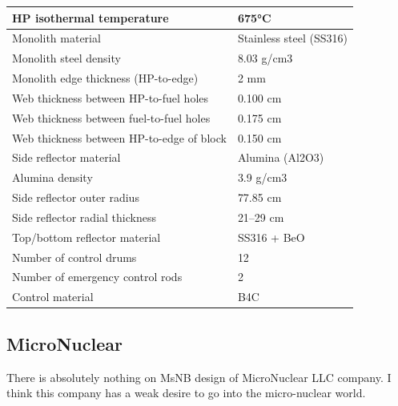 \documentclass[10pt,a4paper]{article}
\begin{document}
\begin{table} [hbtp]
\begin{center}
\begin{tabular}{l     l}
HP isothermal temperature&675°C        \\
\hline 
Monolith material&Stainless steel (SS316)       \\
Monolith steel density&8.03 g/cm3                         \\
Monolith edge thickness (HP-to-edge)&2 mm                                 \\
Web thickness between HP-to-fuel holes&0.100 cm                            \\
Web thickness between fuel-to-fuel holes&0.175 cm                            \\
Web thickness between HP-to-edge of block&0.150 cm                            \\
\hline 
Side reflector material&Alumina (Al2O3)       \\
Alumina density&3.9 g/cm3                        \\
Side reflector outer radius&77.85 cm                                 \\
Side reflector radial thickness&21–29 cm                            \\
Top/bottom reflector material&SS316 + BeO                            \\
\hline 
Number of control drums&12       \\
Number of emergency control rods&2       \\
Control material&B4C                        \\
\hline 

\end{tabular}
\end{center}
\end{table}

\subsection{MicroNuclear}
There is absolutely nothing on MsNB design of MicroNuclear LLC company. I think this company has a weak desire to go into the micro-nuclear world. 
\end{document}
